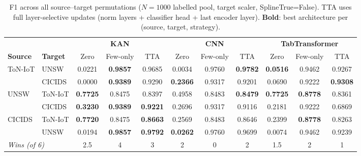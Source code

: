 \begin{table}[t]
\centering
\caption{F1 across all source--target permutations ($N{=}1000$ labelled pool, target scaler, SplineTrue=False).
  TTA uses full layer-selective updates (norm layers + classifier head + last encoder layer).
  \textbf{Bold}: best architecture per (source, target, strategy).}
\label{tab:main_results}
\begin{tabular}{l|l|ccc|ccc|ccc}
\toprule
& & \multicolumn{3}{c|}{\textbf{KAN }} & \multicolumn{3}{c|}{\textbf{CNN }} & \multicolumn{3}{c}{\textbf{TabTransformer }} \\
\textbf{Source} & \textbf{Target} & Zero & Few-only & TTA & Zero & Few-only & TTA & Zero & Few-only & TTA \\
\midrule
\multirow{2}{*}{ToN-IoT}
    & UNSW    & 0.0221 & \textbf{0.9857} & 0.9685 & 0.0034 & 0.9760 & \textbf{0.9782} & \textbf{0.0516} & 0.9462 & 0.9267 \\
    & CICIDS  & 0.0000 & \textbf{0.9389} & 0.9290 & \textbf{0.2366} & 0.9317 & 0.9201 & 0.0690 & 0.9222 & \textbf{0.9308} \\
\midrule
\multirow{2}{*}{UNSW}
    & ToN-IoT & \textbf{0.7725} & 0.8475 & 0.8397 & 0.4958 & 0.8483 & \textbf{0.8479} & \textbf{0.7725} & \textbf{0.8778} & 0.8361 \\
    & CICIDS  & \textbf{0.3230} & \textbf{0.9389} & \textbf{0.9221} & 0.2696 & 0.9317 & 0.9116 & 0.2181 & 0.9222 & 0.6869 \\
\midrule
\multirow{2}{*}{CICIDS}
    & ToN-IoT & \textbf{0.7720} & 0.8475 & \textbf{0.8663} & 0.2569 & 0.8483 & 0.8646 & 0.2399 & \textbf{0.8778} & 0.8263 \\
    & UNSW    & 0.0194 & \textbf{0.9857} & \textbf{0.9792} & \textbf{0.0262} & 0.9760 & 0.9699 & 0.0074 & 0.9462 & 0.9239 \\
\midrule
\multicolumn{2}{l|}{\textit{Wins (of 6)}} & 2.5 & 4 & 3 & 2 & 0 & 2 & 1.5 & 2 & 1 \\
\bottomrule
\end{tabular}
\end{table}